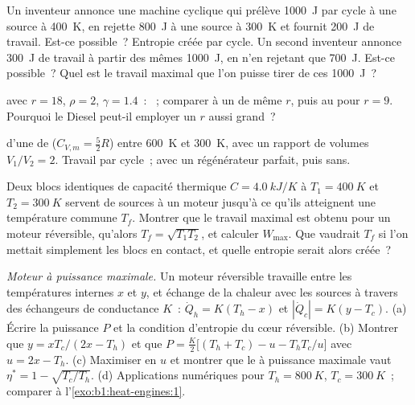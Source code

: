 \begin{exercise}[$\star\star$]\label{exo:b1:heat-engines:6}
Un inventeur annonce une machine cyclique qui prélève \qty{1000}{J} par cycle
à une source à \qty{400}{K}, en rejette \qty{800}{J} à une source à
\qty{300}{K} et fournit \qty{200}{J} de travail. Est-ce possible~? Entropie
créée par cycle. Un second inventeur annonce \qty{300}{J} de travail à partir
des mêmes \qty{1000}{J}, en n'en rejetant que \qty{700}{J}. Est-ce possible~?
Quel est le travail maximal que l'on puisse tirer de ces \qty{1000}{J}~?
\end{exercise}

\begin{exercise}[$\star\star$]\label{exo:b1:heat-engines:7}
 avec $r = 18$, $\rho = 2$, $\gamma = 1.4$~: ~; comparer
à un  de même $r$, puis au  pour $r = 9$. Pourquoi le
Diesel peut-il employer un $r$ aussi grand~?
\end{exercise}

\begin{exercise}[$\star\star$]\label{exo:b1:heat-engines:8}
 d'une  de  ($C_{V,m} = \tfrac52R$) entre
\qty{600}{K} et \qty{300}{K}, avec un rapport de volumes $V_1/V_2 = 2$. Travail
par cycle~;  avec un régénérateur parfait, puis sans.
\end{exercise}

\begin{exercise}[$\star\star$]\label{exo:b1:heat-engines:9}
Deux blocs identiques de capacité thermique $C = \qty{4.0}{kJ/K}$ à $T_1 =
\qty{400}{K}$ et $T_2 = \qty{300}{K}$ servent de sources à un moteur jusqu'à ce
qu'ils atteignent une température commune $T_f$. Montrer que le travail maximal
est obtenu pour un moteur réversible, qu'alors $T_f = \sqrt{T_1T_2}$, et
calculer $W_{\max}$. Que vaudrait $T_f$ si l'on mettait simplement les blocs
en contact, et quelle entropie serait alors créée~?
\end{exercise}

\begin{exercise}[$\star\star\star$]\label{exo:b1:heat-engines:10}
\emph{Moteur à puissance maximale.} Un moteur réversible travaille entre
les températures internes $x$ et $y$, et échange de la chaleur avec les
sources à travers des échangeurs de conductance $K$~: $\dot Q_h = K(T_h - x)$ et
$|\dot Q_c| = K(y - T_c)$. (a) Écrire la puissance $P$ et la condition
d'entropie du cœur réversible. (b) Montrer que $y = xT_c/(2x - T_h)$ et
que $P = \frac{K}{2}\bigl[(T_h + T_c) - u - T_hT_c/u\bigr]$ avec $u = 2x - T_h$.
(c) Maximiser en $u$ et montrer que le  à puissance maximale vaut
$\eta^\ast = 1 - \sqrt{T_c/T_h}$. (d) Applications numériques pour $T_h = \qty{800}{K}$,
$T_c = \qty{300}{K}$~; comparer à l'\cref{exo:b1:heat-engines:1}.
\end{exercise}

